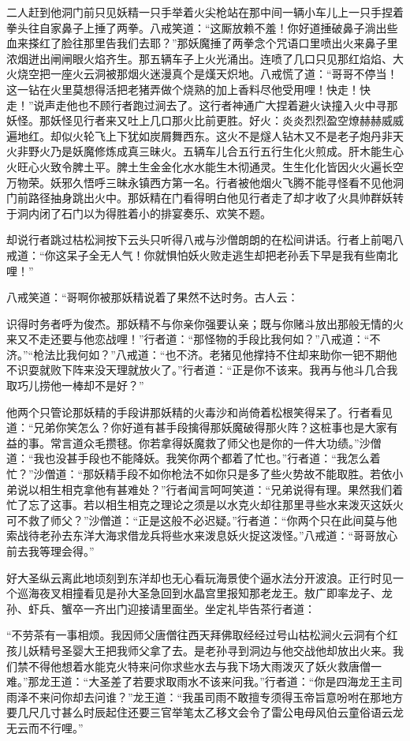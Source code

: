 \documentclass[12pt,UTF8]{ctexbook}
\begin{document}
二人赶到他洞门前只见妖精一只手举着火尖枪站在那中间一辆小车儿上一只手捏着拳头往自家鼻子上捶了两拳。八戒笑道：“这厮放赖不羞！你好道捶破鼻子淌出些血来搽红了脸往那里告我们去耶？”那妖魔捶了两拳念个咒语口里喷出火来鼻子里浓烟迸出闸闸眼火焰齐生。那五辆车子上火光涌出。连喷了几口只见那红焰焰、大火烧空把一座火云洞被那烟火迷漫真个是熯天炽地。八戒慌了道：“哥哥不停当！这一钻在火里莫想得活把老猪弄做个烧熟的加上香料尽他受用哩！快走！快走！”说声走他也不顾行者跑过涧去了。这行者神通广大捏着避火诀撞入火中寻那妖怪。那妖怪见行者来又吐上几口那火比前更胜。好火：炎炎烈烈盈空燎赫赫威威遍地红。却似火轮飞上下犹如炭屑舞西东。这火不是燧人钻木又不是老子炮丹非天火非野火乃是妖魔修炼成真三昧火。五辆车儿合五行五行生化火煎成。肝木能生心火旺心火致令脾土平。脾土生金金化水水能生木彻通灵。生生化化皆因火火遍长空万物荣。妖邪久悟呼三昧永镇西方第一名。行者被他烟火飞腾不能寻怪看不见他洞门前路径抽身跳出火中。那妖精在门看得明白他见行者走了却才收了火具帅群妖转于洞内闭了石门以为得胜着小的排宴奏乐、欢笑不题。

却说行者跳过枯松涧按下云头只听得八戒与沙僧朗朗的在松间讲话。行者上前喝八戒道：“你这呆子全无人气！你就惧怕妖火败走逃生却把老孙丢下早是我有些南北哩！”

八戒笑道：“哥啊你被那妖精说着了果然不达时务。古人云：

识得时务者呼为俊杰。那妖精不与你亲你强要认亲；既与你赌斗放出那般无情的火来又不走还要与他恋战哩！”行者道：“那怪物的手段比我何如？”八戒道：“不济。”“枪法比我何如？”八戒道：“也不济。老猪见他撑持不住却来助你一钯不期他不识耍就败下阵来没天理就放火了。”行者道：“正是你不该来。我再与他斗几合我取巧儿捞他一棒却不是好？”

他两个只管论那妖精的手段讲那妖精的火毒沙和尚倚着松根笑得呆了。行者看见道：“兄弟你笑怎么？你好道有甚手段擒得那妖魔破得那火阵？这桩事也是大家有益的事。常言道众毛攒毬。你若拿得妖魔救了师父也是你的一件大功绩。”沙僧道：“我也没甚手段也不能降妖。我笑你两个都着了忙也。”行者道：“我怎么着忙？”沙僧道：“那妖精手段不如你枪法不如你只是多了些火势故不能取胜。若依小弟说以相生相克拿他有甚难处？”行者闻言呵呵笑道：“兄弟说得有理。果然我们着忙了忘了这事。若以相生相克之理论之须是以水克火却往那里寻些水来泼灭这妖火可不救了师父？”沙僧道：“正是这般不必迟疑。”行者道：“你两个只在此间莫与他索战待老孙去东洋大海求借龙兵将些水来泼息妖火捉这泼怪。”八戒道：“哥哥放心前去我等理会得。”

好大圣纵云离此地顷刻到东洋却也无心看玩海景使个逼水法分开波浪。正行时见一个巡海夜叉相撞看见是孙大圣急回到水晶宫里报知那老龙王。敖广即率龙子、龙孙、虾兵、蟹卒一齐出门迎接请里面坐。坐定礼毕告茶行者道：

“不劳茶有一事相烦。我因师父唐僧往西天拜佛取经经过号山枯松涧火云洞有个红孩儿妖精号圣婴大王把我师父拿了去。是老孙寻到洞边与他交战他却放出火来。我们禁不得他想着水能克火特来问你求些水去与我下场大雨泼灭了妖火救唐僧一难。”那龙王道：“大圣差了若要求取雨水不该来问我。”行者道：“你是四海龙王主司雨泽不来问你却去问谁？”龙王道：“我虽司雨不敢擅专须得玉帝旨意吩咐在那地方要几尺几寸甚么时辰起住还要三官举笔太乙移文会令了雷公电母风伯云童俗语云龙无云而不行哩。”
\end{document}
